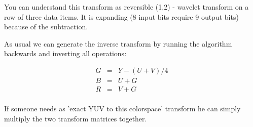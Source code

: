 You can understand this transform as reversible (1,2) - wavelet transform on a row
of three data items. It is expanding (8 input bits require 9 output bits) because
of the subtraction.

As usual we can generate the inverse transform by running the algorithm
backwards and inverting all operations:

\begin{eqnarray}
G &=& Y - (U + V) / 4                                \nonumber\\
B &=& U + G                                          \nonumber\\
R &=& V + G                                          \nonumber\\
\nonumber
\end{eqnarray}

If someone needs as 'exact YUV to this colorspace' transform he can simply 
multiply the two transform matrices together.

